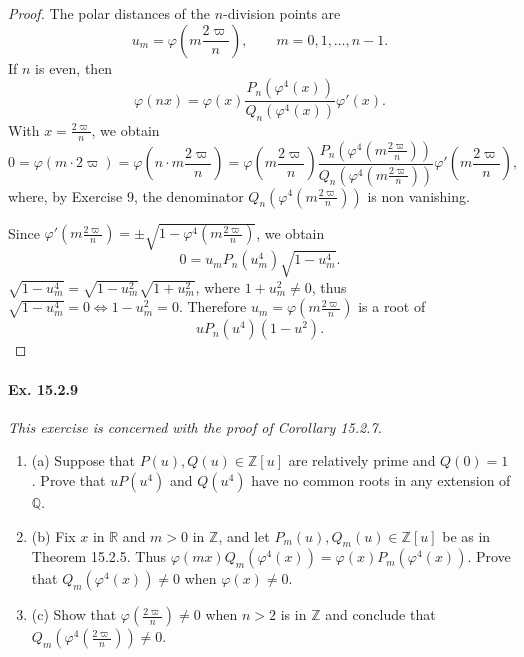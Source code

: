 \documentclass[11pt,a4paper]{article}
\newcommand{\be} {\begin{enumerate}}
\newcommand{\ee} {\end{enumerate}}
\newcommand{\Q}{\mathbb{Q}}
\newcommand{\Z}{\mathbb{Z}}
\newcommand{\R}{\mathbb{R}}
\begin{document}
\begin{proof} 
The polar distances of the $n$-division points are
$$u_m = \varphi\left( m \frac{2 \varpi}{n}\right),\qquad m=0,1,\ldots,n-1.$$
If $n$ is even, then 
$$\varphi(nx) = \varphi(x)\frac{P_{n}\left(\varphi^4(x)\right)}{Q_{n}\left(\varphi^4(x)\right)} \varphi'(x).$$
With $x = \frac{2 \varpi}{n}$, we obtain
$$0 = \varphi(m \cdot 2 \varpi) = \varphi\left(n\cdot  m \frac{2 \varpi}{n}\right) = \varphi\left( m \frac{2 \varpi}{n}\right)\frac{P_n\left(\varphi^4\left( m \frac{2 \varpi}{n}\right)\right)}{Q_n\left(\varphi^4\left( m \frac{2 \varpi}{n}\right)\right)}\varphi'\left(m \frac{2 \varpi}{n}\right),$$
where, by Exercise 9, the denominator $Q_n\left(\varphi^4\left( m \frac{2 \varpi}{n}\right)\right)$ is non vanishing.

Since $\varphi'\left(m \frac{2 \varpi}{n}\right) = \pm\sqrt{1 - \varphi^4\left(m \frac{2 \varpi}{n}\right)}$, we obtain
$$0 = u_m P_n(u_m^4) \sqrt{1 - u_m^4}.$$
$\sqrt{1 - u_m^4} = \sqrt{1 - u_m^2} \sqrt{1+u_m^2}$, where $1+ u_m^2 \ne 0$, thus $\sqrt{1 -u_m^4} = 0 \iff 1 - u_m^2 = 0$. Therefore $u_m= \varphi\left( m \frac{2 \varpi}{n}\right)$ is a root of 
$$u P_n(u^4)(1-u^2).$$
\end{proof}

\paragraph{Ex. 15.2.9}{\it This exercise is concerned with the proof of Corollary 15.2.7.
\be
\item[(a)] Suppose that $P(u), Q(u) \in \Z[u]$ are relatively prime and $Q(0) = 1$. Prove that $uP(u^4)$ and $Q(u^4)$ have no common roots in any extension of $\Q$.
\item[(b)] Fix $x$ in $\R$ and $m>0$ in $\Z$, and let $P_m(u),Q_m(u) \in \Z[u]$ be as in Theorem 15.2.5. Thus $\varphi(mx) Q_m(\varphi^4(x)) = \varphi(x) P_m(\varphi^4(x))$. Prove that $Q_m(\varphi^4(x)) \ne 0$ when $\varphi(x)\ne 0$.
\item[(c)] Show that $\varphi\left(\frac{2 \varpi}{n}\right) \ne 0$ when $n>2$ is in $\Z$ and conclude that $Q_m\left(\varphi^4\left(\frac{2 \varpi}{n}\right)\right) \ne 0$.
\ee
}
\end{document}
